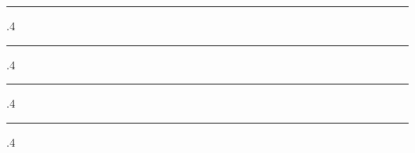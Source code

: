 \documentclass[10pt]{article}
\makeatletter
\newcommand*\rulefill[1][.4\p@]{%
    \leavevmode
    \leaders \hrule \@height #1\relax \hfill
    \null
  }
\makeatother
\begin{document}

\vspace{0.5cm}


\begin{minipage}[t]{123mm}
\noindent
	\textcolor{black!20}{\rulefill\quad 
			{\fontsize{14}{25}\selectfont \textsl{}}
	\quad\rulefill}
\end{minipage}
\hspace{5mm}
\begin{minipage}[t]{62mm}
\noindent
	\textcolor{black!20}{\rulefill\quad 
			{\fontsize{14}{25}\selectfont \textsl{}}
	\quad\rulefill}
\flushleft
\end{minipage}

\vspace{2mm}
\end{document}
